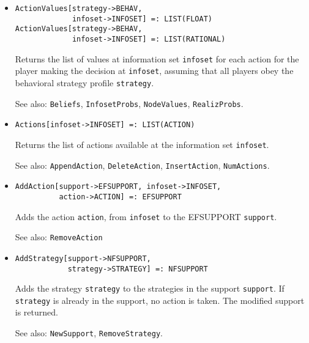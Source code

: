 \begin{itemize}



\item
\protect \large \begin{verbatim}
ActionValues[strategy->BEHAV, 
             infoset->INFOSET] =: LIST(FLOAT)
ActionValues[strategy->BEHAV, 
             infoset->INFOSET] =: LIST(RATIONAL)
\end{verbatim}\normalsize

\bd
Returns the list of values at information set \verb+infoset+ for each
action for the player making the decision at \verb+infoset+, assuming that
all players obey the behavioral strategy profile \verb+strategy+.
\item
[See also:] {\tt Beliefs}, {\tt InfosetProbs}, {\tt NodeValues},
{\tt RealizProbs}.
\ed

\item
\protect \large \begin{verbatim} 
Actions[infoset->INFOSET] =: LIST(ACTION)
\end{verbatim}\normalsize

\bd
Returns the list of actions available at the information set
\verb+infoset+.
\item
[See also:] {\tt AppendAction}, {\tt DeleteAction}, {\tt InsertAction},
{\tt NumActions}.
\ed

\item
\protect \large \begin{verbatim} 
AddAction[support->EFSUPPORT, infoset->INFOSET, 
          action->ACTION] =: EFSUPPORT
\end{verbatim}\normalsize

\bd 
Adds the action \verb+action+, from \verb+infoset+ to the
EFSUPPORT \verb+support+.
\item
[See also:] {\tt RemoveAction}
\ed


\item
\protect \large \begin{verbatim}
AddStrategy[support->NFSUPPORT, 
            strategy->STRATEGY] =: NFSUPPORT
\end{verbatim}\normalsize

\bd
Adds the strategy \verb+strategy+ to the
strategies in the support \verb+support+.  If \verb+strategy+ is already in the
support, no action is taken.  The modified support is returned.
\item
[See also:] {\tt NewSupport}, {\tt RemoveStrategy}.
\ed


\end{itemize}
